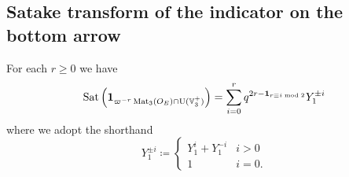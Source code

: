 \subsection{Satake transform of the indicator on the bottom arrow}
\begin{proposition}
  For each $r \ge 0$ we have
  \[ \operatorname{Sat}\left(\mathbf{1}_{\varpi^{-r} \operatorname{Mat}_3(O_E) \cap \operatorname{U}(\mathbb V_3^+)}\right)
    = \sum_{i=0}^r q^{2r - \mathbf{1}_{r \equiv i \bmod 2}} Y_1^{\pm i} \]
  where we adopt the shorthand
  \[
    Y_1^{\pm i} \coloneqq
    \begin{cases}
      Y_1^i + Y_1^{-i} & i > 0 \\
      1 & i = 0 .
    \end{cases}
  \]
\end{proposition}
